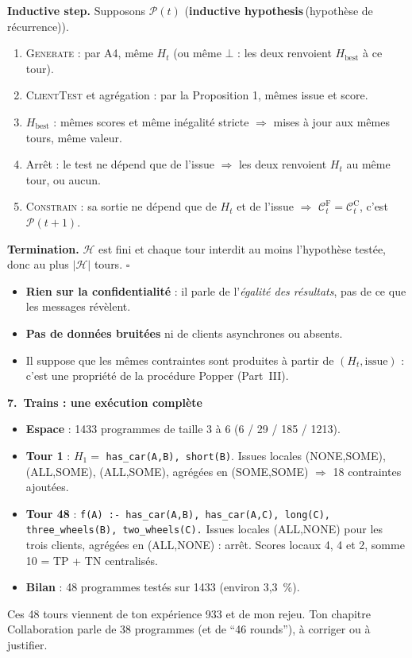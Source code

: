 \documentclass[10pt]{article}
\newcommand{\EN}[2]{\textbf{#1}\,{\scriptsize\textcolor{marine}{(#2)}}}
\newcommand{\titrebox}[2]{\needspace{10\baselineskip}\vspace{8pt}
  \begin{tcolorbox}[colback=marine, colframe=marine, arc=0pt, boxrule=0pt,
    top=4pt, bottom=4pt, left=8pt]
  \color{white}\Large\bfseries #1.~#2
  \end{tcolorbox}\vspace{2pt}}
\newcommand{\st}[1]{\par\needspace{7\baselineskip}\vspace{5pt}{\normalsize\bfseries\textcolor{marine}{#1}}\par\vspace{2pt}}
\begin{document}
\textbf{Inductive step.} Supposons $\mathcal{P}(t)$ (\EN{inductive hypothesis}{hypothèse de récurrence}).
\begin{enumerate}[leftmargin=14pt, itemsep=1pt, topsep=2pt]
  \item \textsc{Generate} : par A4, même $H_t$ (ou même $\bot$ : les deux renvoient $H_{\text{best}}$ à ce tour).
  \item \textsc{ClientTest} et agrégation : par la Proposition 1, mêmes issue et score.
  \item $H_{\text{best}}$ : mêmes scores et même inégalité stricte $\Rightarrow$ mises à jour aux mêmes tours, même valeur.
  \item Arrêt : le test ne dépend que de l'issue $\Rightarrow$ les deux renvoient $H_t$ au même tour, ou aucun.
  \item \textsc{Constrain} : sa sortie ne dépend que de $H_t$ et de l'issue $\Rightarrow$ $\mathcal{C}_t^{\mathrm F}=\mathcal{C}_t^{\mathrm C}$, c'est $\mathcal{P}(t+1)$.
\end{enumerate}
\textbf{Termination.} $\mathcal{H}$ est fini et chaque tour interdit au moins l'hypothèse testée, donc au plus $|\mathcal{H}|$ tours. \hfill $\square$

\st{Ce que le théorème ne dit pas}
\begin{itemize}
  \item \textbf{Rien sur la confidentialité} : il parle de l'\emph{égalité des résultats}, pas de ce que les messages révèlent.
  \item \textbf{Pas de données bruitées} ni de clients asynchrones ou absents.
  \item Il suppose que les mêmes contraintes sont produites à partir de $(H_t,\text{issue})$ : c'est une propriété de la procédure Popper (Part~III).
\end{itemize}

\titrebox{7}{Trains : une exécution complète}
\begin{itemize}
  \item \textbf{Espace} : 1433 programmes de taille 3 à 6 (6 / 29 / 185 / 1213).
  \item \textbf{Tour 1} : $H_1=$ \texttt{has\_car(A,B), short(B)}. Issues locales (NONE,SOME), (ALL,SOME), (ALL,SOME), agrégées en (SOME,SOME) $\Rightarrow$ 18 contraintes ajoutées.
  \item \textbf{Tour 48} : \texttt{f(A) :- has\_car(A,B), has\_car(A,C), long(C), three\_wheels(B), two\_wheels(C).}
        Issues locales (ALL,NONE) pour les trois clients, agrégées en (ALL,NONE) : arrêt. Scores locaux 4, 4 et 2, somme 10 = TP + TN centralisés.
  \item \textbf{Bilan} : 48 programmes testés sur 1433 (environ 3,3~\%).
\end{itemize}
\begin{piege}
Ces 48 tours viennent de ton expérience 933 et de mon rejeu. Ton chapitre Collaboration parle de 38 programmes (et de ``46 rounds''), à corriger ou à justifier.
\end{piege}
\end{document}
